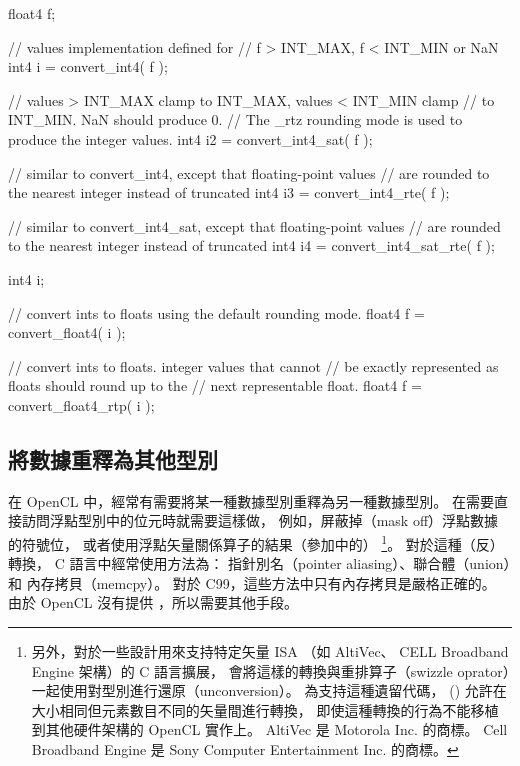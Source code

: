 \startexample
\startclc
float4 f;

// values implementation defined for
// f > INT_MAX, f < INT_MIN or NaN
int4	i = convert_int4( f );

// values > INT_MAX clamp to INT_MAX, values < INT_MIN clamp
// to INT_MIN. NaN should produce 0.
// The _rtz rounding mode is used to produce the integer values.
int4	i2 = convert_int4_sat( f );

// similar to convert_int4, except that floating-point values
// are rounded to the nearest integer instead of truncated
int4	i3 = convert_int4_rte( f );

// similar to convert_int4_sat, except that floating-point values
// are rounded to the nearest integer instead of truncated
int4	i4 = convert_int4_sat_rte( f );
\stopclc
\stopexample

\startexample
\startclc
int4	i;

// convert ints to floats using the default rounding mode.
float4 f = convert_float4( i );

// convert ints to floats. integer values that cannot
// be exactly represented as floats should round up to the
// next representable float.
float4 f = convert_float4_rtp( i );
\stopclc
\stopexample

\subsection[sec:reinterpret]{將數據重釋為其他型別}

在 OpenCL 中，經常有需要將某一種數據型別重釋為另一種數據型別。
在需要直接訪問浮點型別中的位元時就需要這樣做，
例如，屏蔽掉（mask off）浮點數據的符號位，
或者使用浮點矢量關係算子的結果（參加中的）
\footnote{另外，對於一些設計用來支持特定矢量 ISA
（如 AltiVec、 CELL Broadband Engine 架構）的 C 語言擴展，
會將這樣的轉換與重排算子（swizzle oprator）一起使用對型別進行還原（unconversion）。
為支持這種遺留代碼， () 允許在大小相同但元素數目不同的矢量間進行轉換，
即使這種轉換的行為不能移植到其他硬件架構的 OpenCL 實作上。
 AltiVec 是 Motorola Inc. 的商標。
 Cell Broadband Engine 是 Sony Computer Entertainment Inc. 的商標。}。
對於這種（反）轉換， C 語言中經常使用方法為：
指針別名（pointer aliasing）、聯合體（union）和 內存拷貝（memcpy）。
對於 C99，這些方法中只有內存拷貝是嚴格正確的。
由於 OpenCL 沒有提供 ，所以需要其他手段。


